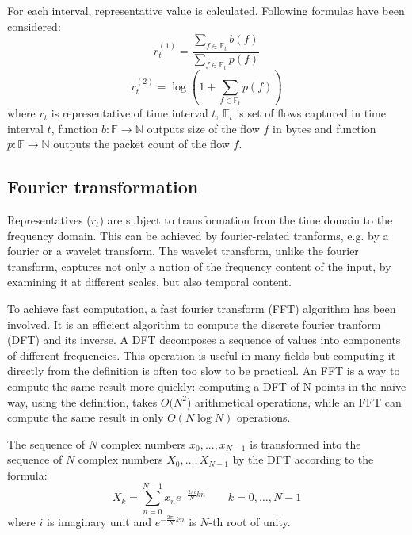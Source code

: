 \documentclass[a4paper]{IEEEtran}
\begin{document}
For each interval,
representative value is calculated. Following formulas have been considered:
\begin{equation}
r_t^{(1)} = \frac{\sum\limits_{f\in \mathbb{F}_t}b(f)}{\sum\limits_{f\in \mathbb{F}_t}p(f)}
\end{equation}
\begin{equation}
r_t^{(2)} = \log(1+\sum\limits_{f\in \mathbb{F}_t}p(f))
\end{equation}
where $r_t$ is representative of time interval $t$, $\mathbb{F}_t$ is set of flows captured in time 
interval $t$, function $b:\mathbb{F} \rightarrow \mathbb{N}$ outputs size of the flow $f$ in bytes and function 
$p:\mathbb{F} \rightarrow \mathbb{N}$ outputs the packet count of the flow $f$.


\subsection{Fourier transformation}
Representatives ($r_t$) are subject to transformation from the time domain to the
frequency domain.
This can be achieved by fourier-related
tranforms, e.g. by a fourier or a wavelet transform.
The wavelet transform, unlike the fourier transform, captures
not only a notion of the frequency content of the input, by
examining it at different scales, but also temporal content.

To achieve fast computation, a fast fourier transform (FFT) algorithm 
has been involved.
It is an efficient algorithm to compute the discrete fourier tranform (DFT) and
its inverse.
A DFT decomposes a sequence of values into components of
different frequencies. 
This operation is useful in many fields but computing it directly from the
definition is often too slow to be practical.
An FFT is a way to compute the same result more quickly: 
computing a DFT of N points in the naive way, using the definition, takes
$O(N^2$) arithmetical operations, 
while an FFT can compute the same result in only $ O(N \log N)$ operations.

The sequence of $N$ complex numbers $x_0, ..., x_{N−1}$ is transformed into the
sequence of $N$ complex numbers $X_0, ..., X_{N−1}$ by the DFT according to the
formula:
\begin{equation}
X_k = \sum_{n=0}^{N-1} x_n e^{-\frac{2 \pi i}{N} k n} \quad \quad k = 0, \dots, N-1
\end{equation}
where $i$ is imaginary unit and $e^{-\frac{2 \pi i}{N} k n}$ is $N$-th root of
unity. 
\end{document}
